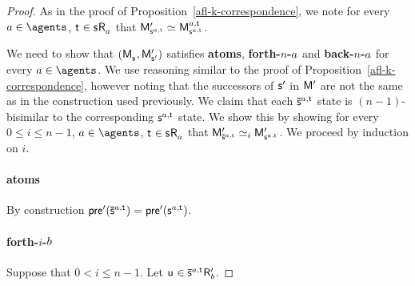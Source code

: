 \begin{proof}
    As in the proof of Proposition~\ref{afl-k-correspondence}, we note for every $\agentA \in \agents$, $\aStateT \in \aStateS \aAccessibility{\agentA}$ that $\aPModel[\prime]{\aStateS[\agentA,\aStateT]} \bisimilar \aPModel[\agentA,\aStateT]{\aStateS[\agentA,\aStateT]}$.

    We need to show that $(\aPModel{\aStateS}, \aPModel[\prime]{\aStateS[\prime]})$ satisfies {\bf atoms}, {\bf forth-$n$-$\agentA$} and {\bf back-$n$-$\agentA$} for every $\agentA \in \agents$.
    We use reasoning similar to the proof of Proposition~\ref{afl-k-correspondence}, however noting that the successors of $\aStateS[\prime]$ in $\aModel[\prime]$ are not the same as in the construction used previously.
    We claim that each $\aPStateS[\agentA,\aStateT]$ state is $(n-1)$-bisimilar to the corresponding $\aStateS[\agentA,\aStateT]$ state.
    We show this by showing for every $0 \leq i \leq n - 1$, $\agentA \in \agents$, $\aStateT \in \aStateS \aAccessibility{\agentA}$ that $\aPModel[\prime]{\aPStateS[\agentA,\aStateT]} \bisimilar[i] \aPModel[\prime]{\aStateS[\agentA,\aStateT]}$.
    We proceed by induction on $i$.

    \paragraph{atoms} By construction $\aPrecondition[\prime](\aPStateS[\agentA, \aStateT]) = \aPrecondition[\prime](\aStateS[\agentA,\aStateT])$.

    \paragraph{forth-$i$-$\agentB$} Suppose that $0 < i \leq n - 1$. Let $\aStateU \in \aPStateS[\agentA,\aStateT] \aAccessibility[\prime]{\agentB}$. 
    

\end{proof}
